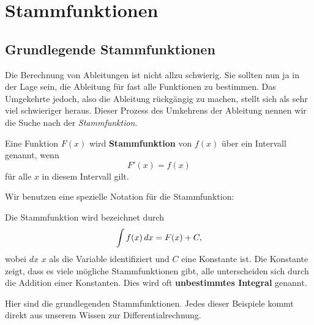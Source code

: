 \chapter{Stammfunktionen}

\section{Grundlegende Stammfunktionen}

Die Berechnung von Ableitungen ist nicht allzu schwierig. Sie sollten nun ja in der Lage sein, die Ableitung für fast alle Funktionen zu bestimmen. Das Umgekehrte jedoch, also die Ableitung rückgängig zu machen, stellt sich als sehr viel schwieriger heraus. Dieser Prozess des Umkehrens der Ableitung nennen wir die Suche nach der \textit{Stammfunktion}.


\begin{definition}
Eine Funktion $F(x)$ wird \textbf{Stammfunktion} von $f(x)$ über ein Intervall genannt, wenn 
\[
F'(x) = f(x)
\]
für alle $x$ in diesem Intervall gilt.
\end{definition}

Wir benutzen eine spezielle Notation für die Stammfunktion:

\begin{definition}
Die Stammfunktion wird bezeichnet durch
\[
\int f(x) \, d x = F(x)+C,
\]
wobei $dx$ $x$ als die Variable identifiziert und $C$ eine Konstante ist. Die Konstante zeigt, dass es viele mögliche Stammfunktionen gibt, alle unterscheiden sich durch die Addition einer Konstanten. Dies wird oft \textbf{unbestimmtes Integral} genannt.
\end{definition}

Hier sind die grundlegenden Stammfunktionen. Jedes dieser Beispiele kommt direkt aus unserem Wissen zur Differentialrechnung.

